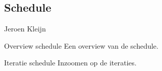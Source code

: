 \begin{frame}
    \section{Schedule}

    Jeroen Kleijn
\end{frame}

\begin{frame}[label=schedule1]{Overview schedule}
    Een overview van de schedule.
\end{frame}

\begin{frame}[label=schedule2]{Iteratie schedule}
    Inzoomen op de iteraties.
\end{frame}
